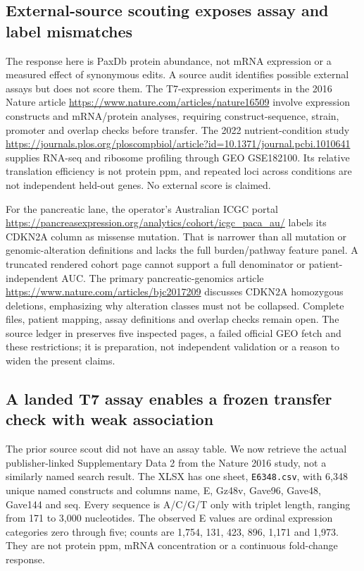 \subsection{External-source scouting exposes assay and label mismatches}
The response here is PaxDb protein abundance, not mRNA expression or a measured effect of synonymous edits. A source audit identifies possible external assays but does not score them. The T7-expression experiments in the 2016 Nature article \url{https://www.nature.com/articles/nature16509} involve expression constructs and mRNA/protein analyses, requiring construct-sequence, strain, promoter and overlap checks before transfer. The 2022 nutrient-condition study \url{https://journals.plos.org/ploscompbiol/article?id=10.1371/journal.pcbi.1010641} supplies RNA-seq and ribosome profiling through GEO GSE182100. Its relative translation efficiency is not protein ppm, and repeated loci across conditions are not independent held-out genes. No external score is claimed.

For the pancreatic lane, the operator's Australian ICGC portal \url{https://pancreasexpression.org/analytics/cohort/icgc_paca_au/} labels its CDKN2A column as missense mutation. That is narrower than all mutation or genomic-alteration definitions and lacks the full burden/pathway feature panel. A truncated rendered cohort page cannot support a full denominator or patient-independent AUC. The primary pancreatic-genomics article \url{https://www.nature.com/articles/bjc2017209} discusses CDKN2A homozygous deletions, emphasizing why alteration classes must not be collapsed. Complete files, patient mapping, assay definitions and overlap checks remain open. The source ledger in  preserves five inspected pages, a failed official GEO fetch and these restrictions; it is preparation, not independent validation or a reason to widen the present claims.

\subsection{A landed T7 assay enables a frozen transfer check with weak association}
The prior source scout did not have an assay table. We now retrieve the actual publisher-linked Supplementary Data 2 from the Nature 2016 study, not a similarly named search result. The XLSX has one sheet, \texttt{E6348.csv}, with 6,348 unique named constructs and columns name, E, Gz48v, Gave96, Gave48, Gave144 and seq. Every sequence is A/C/G/T only with triplet length, ranging from 171 to 3,000 nucleotides. The observed E values are ordinal expression categories zero through five; counts are 1,754, 131, 423, 896, 1,171 and 1,973. They are not protein ppm, mRNA concentration or a continuous fold-change response.


